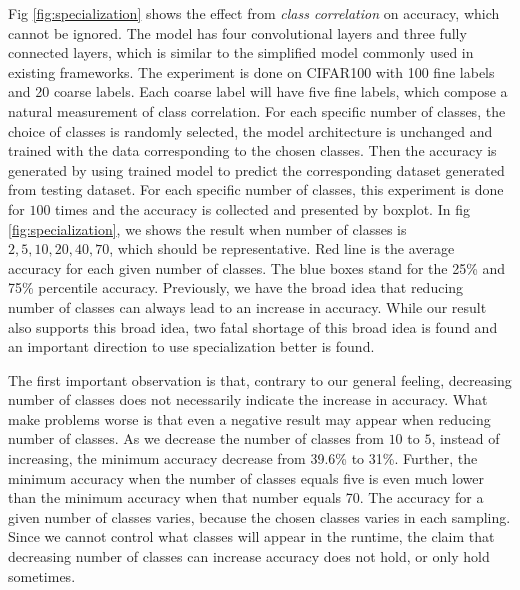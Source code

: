 \documentclass[conference]{IEEEtran}
\begin{document}
\begin{spacing}{0.9}
Fig \ref{fig:specialization} shows the effect from \textit{class correlation} on accuracy, which cannot be ignored. The model has four convolutional layers and three fully connected layers, which is similar to the simplified model commonly used in existing frameworks. The experiment is done on CIFAR100 with 100 fine labels and 20 coarse labels. Each coarse label will have five fine labels, which compose a natural measurement of class correlation. For each specific number of classes, the choice of classes is randomly selected, the model architecture is unchanged and trained with the data corresponding to the chosen classes. Then the accuracy is generated by using trained model to predict the corresponding dataset generated from testing dataset. For each specific number of classes, this experiment is done for $100$ times and the accuracy is collected and presented by boxplot. In fig \ref{fig:specialization}, we shows the result when number of classes is $2, 5, 10, 20, 40, 70$, which should be representative. Red line is the average accuracy for each given number of classes. The blue boxes stand for the 25\%  and  75\%  percentile  accuracy. Previously, we have the broad idea that reducing number of classes can always lead to an increase in accuracy. While our result also supports this broad idea, two fatal shortage of this broad idea is found and an important direction to use specialization better is found.

The first important observation is that, contrary to our general feeling, decreasing number of classes does not necessarily indicate the increase in accuracy. What make problems worse is that even a negative result may appear when reducing number of classes. As we decrease the number of classes from $10$ to $5$, instead of increasing, the minimum accuracy decrease from 39.6\% to 31\%. Further, the minimum accuracy when the number of classes equals five is even much lower than the minimum accuracy when that number equals 70. The accuracy for a given number of classes varies, because the chosen classes varies in each sampling. Since we cannot control what classes will appear in the runtime, the claim that decreasing number of classes can increase accuracy does not hold, or only hold sometimes.


\end{spacing}
\end{document}
